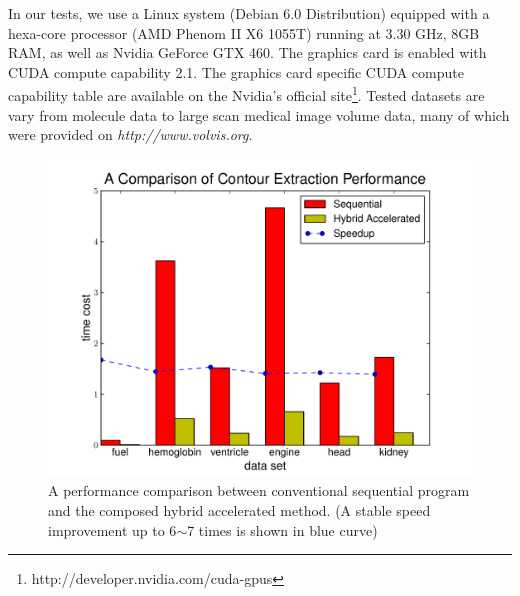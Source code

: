 \documentclass[11pt, b5paper]{report}
\begin{document}
In our tests, we use a Linux system (Debian 6.0 Distribution) equipped with 
a hexa-core processor (AMD Phenom II X6 1055T) running at 3.30 GHz, 8GB RAM, 
as well as Nvidia GeForce GTX 460. The graphics card is enabled with CUDA 
compute capability 2.1. 
The graphics card specific CUDA compute capability table are available on 
the Nvidia's official site\footnote{http://developer.nvidia.com/cuda-gpus}.
Tested datasets are vary from molecule data to large scan medical image 
volume data, many of which were provided on \textsl{http://www.volvis.org}.

\begin{figure}[h!]
  \centering
  \includegraphics[width=\textwidth-1cm]{images/fig-perf-bar.pdf}
  \caption[Performance comparison with the original method]
  {A performance comparison between conventional sequential program and the 
    composed hybrid accelerated method. (A stable speed improvement up to 
    6$\sim$7 times is shown in blue curve)
  }
  \label{fig:_perf_bar}
\end{figure}


\end{document}
